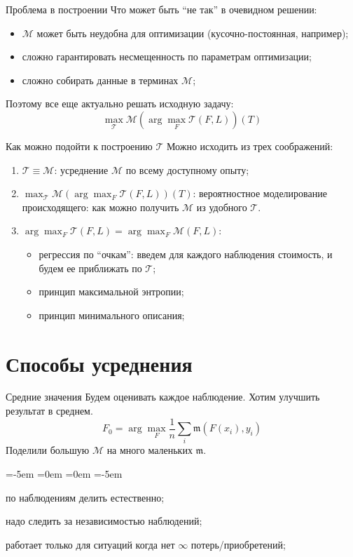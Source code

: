 \documentclass[14pt, fleqn, xcolor={dvipsnames, table}]{beamer}
\begin{document}
\begin{frame}{Проблема в построении}
Что может быть ``не так'' в очевидном решении:
\begin{itemize}
  \item $\mathcal{M}$ может быть неудобна для оптимизации (кусочно-постоянная, например);
  \item сложно гарантировать несмещенность по параметрам оптимизации;
  \item сложно собирать данные в терминах $\mathcal{M}$;
\end{itemize} 
Поэтому все еще актуально решать исходную задачу:
$$
\max_{\mathcal{T}} \mathcal{M} \left(\arg\max_{F} \mathcal{T}(F, L)\right)(T)
$$
\end{frame}

\begin{frame}{Как можно подойти к построению $\mathcal{T}$}
Можно исходить из трех соображений:
\begin{enumerate}
  \item {\color{blue}$\mathcal{T} \equiv \mathcal{M}$:} усреднение $\mathcal{M}$ по всему доступному опыту;
  \item {\color{blue}$\max_{\mathcal{T}} \mathcal{M} \left(\arg\max_{F} \mathcal{T}(F, L)\right)(T)$:} вероятностное моделирование происходящего: как можно получить $\mathcal{M}$ из удобного $\mathcal{T}$.
  \item {\color{blue}$\arg\max_{F} \mathcal{T}(F, L) = \arg\max_{F} \mathcal{M}(F, L)$:}~\\
  \begin{itemize}
    \item регрессия по ``очкам'': введем для каждого наблюдения стоимость, и будем ее приближать по $\mathcal{T}$;
    \item принцип максимальной энтропии;
    \item принцип минимального описания;
  \end{itemize}
\end{enumerate} 
\end{frame}

\section{Способы усреднения}

\begin{frame}{Средние значения}
Будем оценивать каждое наблюдение. Хотим улучшить результат в среднем.
$$
F_0 = \arg \max_F \frac{1}{n} \sum_i \mathfrak{m}(F(x_i),y_i)
$$
Поделили большую $\mathcal{M}$ на много маленьких $\mathfrak{m}$. 
\begin{description}
\small
\leftmargin=-5em
\itemindent=0em
=0em
\leftskip=-5em
  \item[\color{green}+] по наблюдениям делить естественно;
  \item[\color{red}---] надо следить за независимостью наблюдений;
  \item[\color{red}---] работает только для ситуаций когда нет $\infty$ потерь/приобретений;
\end{description} 
\end{frame}
\end{document}
